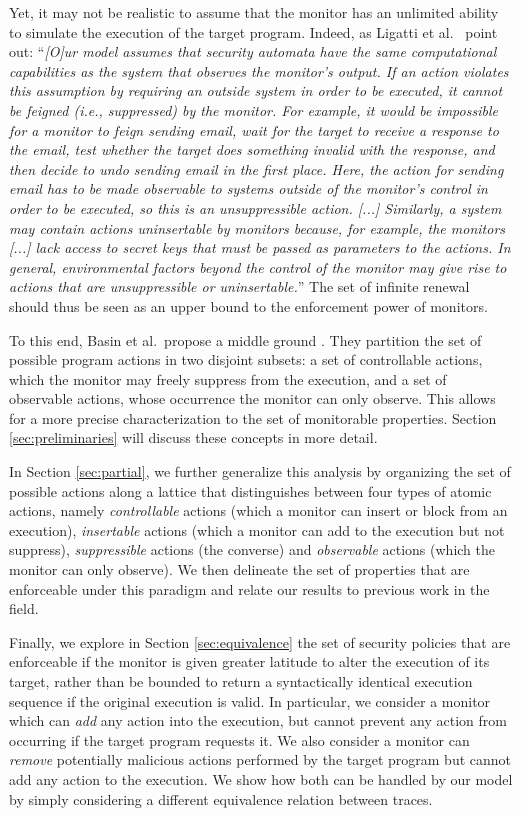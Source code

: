 \documentclass[12pt]{article}
\begin{document}
Yet, it may not be realistic to assume that the monitor has an unlimited ability to simulate the execution of the target program.
Indeed,  as Ligatti et al.\  \cite{nonsafetyJournal} point out: ``\textit{[O]ur model assumes that security automata have the same computational capabilities as the system that observes the monitor's output. If an action violates this assumption by requiring an outside system in order to be executed, it cannot be feigned (i.e., suppressed) by the monitor. For example, it would be impossible for a monitor to feign sending email, wait for the target to receive a response to the email, test whether the target does something invalid with the response, and then decide to undo sending email in the first place. Here, the action for sending email has to be made observable to systems outside of the monitor's control in order to be executed, so this is an unsuppressible action. [...] Similarly, a system may contain actions uninsertable by monitors because, for example, the monitors [...] lack access to secret keys that must be passed as parameters to the actions. In general, environmental factors beyond the control of the monitor may give rise to actions that are unsuppressible or uninsertable.}''
The set of infinite renewal should thus be seen as an upper bound to the enforcement power of monitors.

To this end, Basin et al.\ propose a middle ground \cite{enforceableRevisited}. They partition the set of possible program actions in two disjoint subsets: a set of controllable actions, which the monitor may freely suppress from the execution, and a set of observable actions, whose occurrence the monitor can only observe. This allows for a more precise characterization to the set of monitorable properties. Section \ref{sec:preliminaries} will discuss these concepts in more detail.

In Section \ref{sec:partial}, we further generalize this analysis by organizing the set of possible actions along a lattice that distinguishes between four types of atomic actions, namely \emph{controllable} actions (which a monitor can insert or block from an execution), \emph{insertable} actions (which a monitor can add to the execution but not suppress), \emph{suppressible} actions (the converse) and \emph{observable} actions (which the monitor can only observe). We then delineate the set of properties that are enforceable under this paradigm and relate our results to previous work in the field.

Finally, we explore in Section \ref{sec:equivalence} the set of security policies that are enforceable if the monitor is given greater latitude to alter the execution of its target, rather than be bounded to return a syntactically identical execution sequence if the original execution is valid. In particular, we consider a monitor which can \textit{add} any action into the execution, but cannot prevent any action from occurring if the target program requests it. We also consider a monitor can \textit{remove} potentially malicious actions  performed by the target program but cannot add any action to the execution. We show how both can be handled by our model by simply considering a different equivalence relation between traces.
\end{document}
